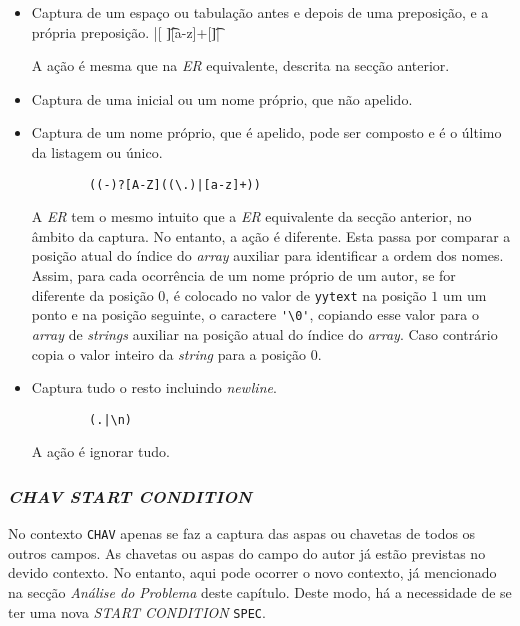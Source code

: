 \begin{itemize}
	
	 \item Captura de um espaço ou tabulação antes e depois de uma
		 preposição, e a própria preposição.
		|[ \t][a-z]+[\t ]|

		 A ação é mesma que na \emph{ER} equivalente, descrita na secção anterior.

	 \item Captura de uma inicial ou um nome próprio, que não apelido.

	 \item Captura de um nome próprio, que é apelido, pode ser composto
		 e é o último da listagem ou único.
    \begin{verbatim}
		((-)?[A-Z]((\.)|[a-z]+))
    \end{verbatim}
		A \emph{ER} tem o mesmo intuito que a \emph{ER} equivalente da secção
		anterior, no âmbito da captura. No entanto, a ação é diferente.
		Esta passa por comparar a posição atual do índice do \emph{array} auxiliar
		para identificar a ordem dos nomes. Assim, para cada ocorrência de um nome
		próprio de um autor, se for diferente da posição $0$, é colocado no valor de
		\texttt{yytext} na posição $1$ um um ponto e na posição seguinte,
		o caractere \verb|'\0'|, copiando esse valor para o \emph{array} de
		\emph{strings} auxiliar na posição atual do índice do \emph{array}. Caso
		contrário copia o valor inteiro da \emph{string} para a posição $0$.

	 \item Captura tudo o resto incluindo \emph{newline}.
    \begin{verbatim}
		(.|\n)
    \end{verbatim}
	A ação é ignorar tudo.


\end{itemize}


\subsubsection{\emph{CHAV \emph{START CONDITION}}}

No contexto \texttt{CHAV} apenas se faz a captura das aspas ou chavetas de todos
os outros campos. As chavetas ou aspas do campo do autor já estão previstas  no
devido contexto. No entanto, aqui pode ocorrer o novo contexto, já mencionado na
secção \emph{Análise do Problema} deste capítulo. Deste modo, há a necessidade
de se ter uma nova \emph{START CONDITION} \texttt{SPEC}.


